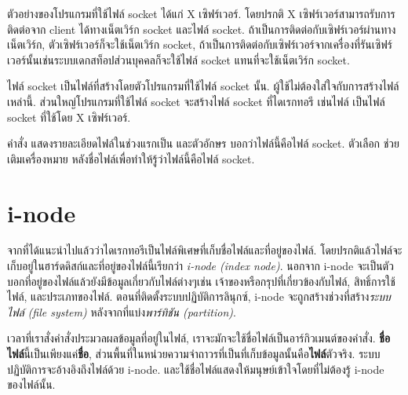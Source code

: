 \begin{thwbr}
ตัวอย่างของโปรแกรมที่ใช้ไฟล์ socket ได้แก่ X เซิฟร์เวอร์. โดยปรกติ X เซิฟร์เวอร์สามารถรับการติดต่อจาก client ได้ทางเน็ตเวิร์ก socket และไฟล์ socket. ถ้าเป็นการติดต่อกับเซิฟร์เวอร์ผ่านทางเน็ตเวิร์ก, ตัวเซิฟร์เวอร์ก็จะใช้เน็ตเวิร์ก socket, ถ้าเป็นการติดต่อกับเซิฟร์เวอร์จากเครื่องที่รันเซิฟร์เวอร์นั้นเช่นระบบเดกสท็อปส่วนบุคคลก็จะใช้ไฟล์ socket แทนที่จะใช้เน็ตเวิร์ก socket. 

ไฟล์ socket เป็นไฟล์ที่สร้างโดยตัวโปรแกรมที่ใช้ไฟล์ socket นั้น. ผู้ใช้ไม่ต้องใส่ใจกับการสร้างไฟล์เหล่านี้. ส่วนใหญ่โปรแกรมที่ใช้ไฟล์ socket จะสร้างไฟล์ socket ที่ไดเรกทอรี  เช่นไฟล์  เป็นไฟล์ socket ที่ใช้โดย X เซิฟร์เวอร์.

\begin{MyExample}
\end{MyExample}%

คำสั่ง  แสดงรายละเอียดไฟล์ในช่วงแรกเป็น  และตัวอักษร  บอกว่าไฟล์นี้คือไฟล์ socket. ตัวเลือก  ช่วยเติมเครื่องหมาย \cmd{=} หลังชื่อไฟล์เพื่อทำให้รู้ว่าไฟล์นี้คือไฟล์ socket.



\section{i-node}
จากที่ได้แนะนำไปแล้วว่าไดเรกทอรีเป็นไฟล์พิเศษที่เก็บชื่อไฟล์และที่อยู่ของไฟล์. โดยปรกติแล้วไฟล์จะเก็บอยู่ในฮาร์ดดิสก์และที่อยู่ของไฟล์นี้เรียกว่า \emph{i-node (index node)}. นอกจาก i-node จะเป็นตัวบอกที่อยู่ของไฟล์แล้วยังมีข้อมูลเกี่ยวกับไฟล์ต่างๆเช่น เจ้าของหรือกรุปที่เกี่ยวข้องกับไฟล์, สิทธิ์การใช้ไฟล์, และประเภทของไฟล์. ตอนที่ติดตั้งระบบปฏิบัติการลินุกซ์, i-node จะถูกสร้างช่วงที่สร้าง\emph{ระบบไฟล์ (file system)} %
%
 หลังจากที่แบ่ง\emph{พาร์ทิชัน (partition)}.%
%

เวลาที่เราสั่งคำสั่งประมวลผลข้อมูลที่อยู่ในไฟล์, เราจะมักจะใช้ชื่อไฟล์เป็นอาร์กิวเมนต์ของคำสั่ง. \textbf{ชื่อไฟล์}นี้เป็นเพียงแค่\textbf{ชื่อ}, ส่วนพื้นที่ในหน่วยความจำถาวรที่เป็นที่เก็บข้อมูลนั้นคือ\textbf{ไฟล์}ตัวจริง. ระบบปฏิบัติการจะอ้างอิงถึงไฟล์ด้วย i-node. และใช้ชื่อไฟล์แสดงให้มนุษย์เข้าใจโดยที่ไม่ต้องรู้ i-node ของไฟล์นั้น. 


\end{thwbr}
